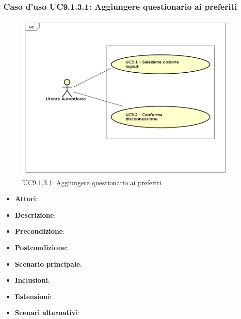 				\subsubsection{Caso d'uso UC9.1.3.1: Aggiungere questionario ai preferiti}
				\label{UC9.1.3.1}
				\begin{figure}[h]
					\centering
					\includegraphics[scale=0.7,keepaspectratio]{UML/UC9.png}
					\caption{UC9.1.3.1: Aggiungere questionario ai preferiti}
				\end{figure}
				\FloatBarrier
				\begin{itemize}
					\item \textbf{Attori}: 
					\item \textbf{Descrizione}: 
					\item \textbf{Precondizione}: 
					\item \textbf{Postcondizione}: 
					\item \textbf{Scenario principale}:
					\item \textbf{Inclusioni}:
					\item \textbf{Estensioni}:
					\item \textbf{Scenari alternativi}:
				\end{itemize}
				
